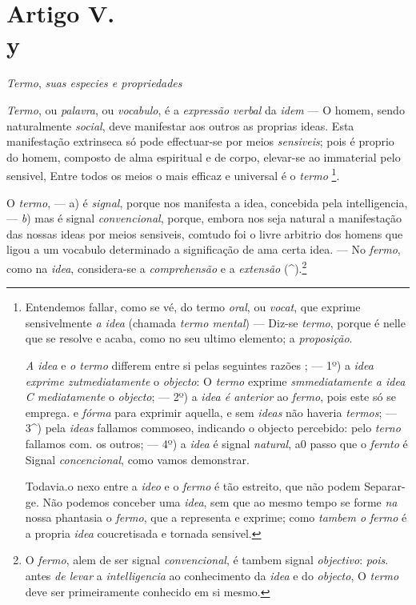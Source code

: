 
\section*{Artigo V.\\ y}

  \emph{Termo}, \emph{suas especies e propriedades}


\emph{Termo}, ou \emph{palavra}, ou \emph{vocabulo}, é a \emph{expressão verbal} da \emph{idem} --- O homem, sendo naturalmente \emph{social}, deve manifestar aos outros as proprias ideas. Esta manifestação extrinseca só pode effectuar-se por meios \emph{sensiveis}; pois é proprio do homem, composto de alma espiritual e de corpo, elevar-se ao immaterial pelo sensivel, Entre todos os meios o mais efficaz e universal é o \emph{termo} \footnote{Entendemos fallar, como se vé, do termo \emph{oral}, ou \emph{vocat}, que exprime sensivelmente \emph{a idea} (chamada \emph{termo mental}) --- Diz-se \emph{termo}, porque é nelle que se resolve e acaba, como no seu ultimo elemento; a \emph{proposição}.\par \emph{A idea} e \emph{o termo} differem entre si pelas seguintes razões ; --- 1º) a \emph{idea exprime zutmediatamente} o \emph{objecto}: O \emph{termo} exprime \emph{smmediatamente a idea C mediatamente} o \emph{objecto}; --- 2º) a \emph{idea é anterior} ao \emph{fermo}, pois este só se emprega. e \emph{fórma} para exprimir aquella, e sem \emph{ideas} não haveria \emph{termos}; --- 3\textasciicircum{}) pela \emph{ideas} fallamos commoseo, indicando o objecto percebido: pelo \emph{terno} fallamos com. os outros; --- 4º) a \emph{idea} é signal \emph{natural}, a0 passo que o \emph{fernto} é Signal \emph{concencional}, como vamos demonstrar.\par Todavia.o nexo entre a \emph{ideo} e o \emph{fermo} é tão estreito, que não podem Separar-ge. Não podemos conceber uma \emph{idea}, sem que ao mesmo tempo se forme \emph{na} nossa phantasia o \emph{fermo}, que a representa e exprime; como \emph{tambem o fermo} é a propria \emph{idea} coucretisada e tornada sensivel.}.


O \emph{termo}, --- a) é \emph{signal}, porque nos manifesta a idea, concebida pela intelligencia, --- \emph{b}) mas é signal \emph{convencional}, porque, embora nos seja natural a manifestação das nossas ideas por meios sensiveis, comtudo foi o livre arbitrio dos homens que ligou a um vocabulo determinado a significação de ama certa idea. --- No \emph{fermo}, como na \emph{idea}, considera-se a \emph{comprehensão} e a \emph{extensão} (\textasciicircum{}).\footnote{O \emph{fermo}, alem de ser signal \emph{convencional}, é tambem signal \emph{objectivo}: \emph{pois}. antes \emph{de levar} a \emph{intelligencia} ao conhecimento da \emph{idea} e do \emph{objecto}, O \emph{termo} deve ser primeiramente conhecido em si mesmo.}

